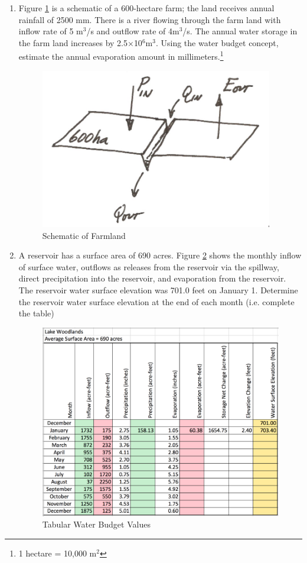\documentclass[12pt]{article}
\begin{document}
\begin{enumerate}
\clearpage
\item Figure \ref{fig:farmland} is a schematic of a 600-hectare farm; the land receives annual rainfall of 2500 mm.  There is a river flowing through the farm land with inflow rate of 5 m$^3$/s and outflow rate of 4m$^3$/s.  The annual water storage in the farm land increases by 2.5$\times$10$^6$m$^3$.  Using the water budget concept, estimate the annual evaporation amount in millimeters.\footnote{1 hectare = 10,000 m$^2$}

\begin{figure}[h!] %
   \centering
   \includegraphics[width=4in]{farmland.png} 
   \caption{Schematic of Farmland}
   \label{fig:farmland}
\end{figure}
\clearpage
\item A reservoir has a surface area of 690 acres.  Figure \ref{fig:reservoir} shows the monthly inflow of surface water, outflows as releases from the reservoir via the spillway, direct precipitation into the reservoir, and evaporation from the reservoir.  The reservoir water surface elevation was 701.0 feet on January 1.  Determine the reservoir water surface elevation at the end of each month (i.e. complete the table)

\begin{figure}[h!] %
   \centering
   \includegraphics[width=6in]{Reservior.pdf} 
   \caption{Tabular Water Budget Values}
   \label{fig:reservoir}
\end{figure}


    
\end{enumerate}
\end{document}
